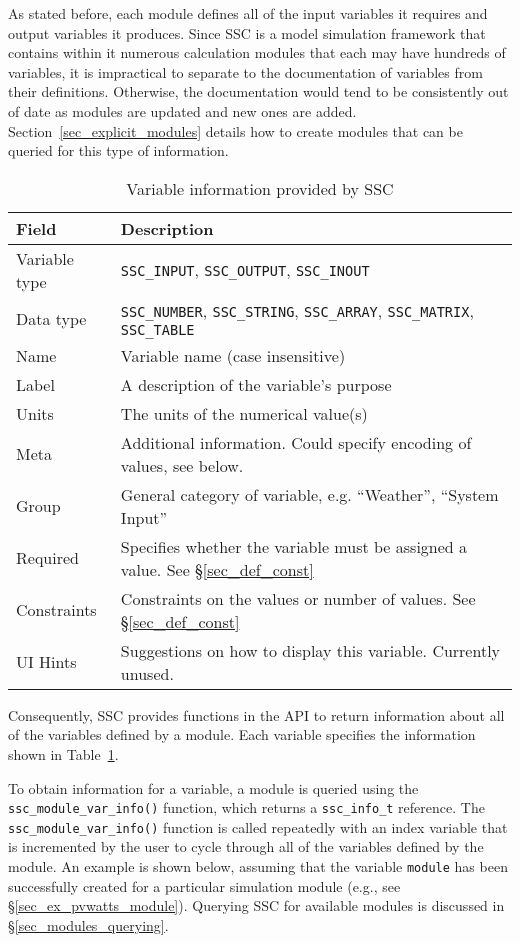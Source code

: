 \documentclass{article}
\begin{document}
As stated before, each module defines all of the input variables it requires and output variables it produces.  Since SSC is a model simulation framework that contains within it numerous calculation modules that each may have hundreds of variables, it is impractical to separate to the documentation of variables from their definitions.  Otherwise, the documentation would tend to be consistently out of date as modules are updated and new ones are added.  Section~\ref{sec_explicit_modules} details how to create modules that can be queried for this type of information.

\begin{table}[ht]
\begin{center}
\begin{tabular}{ll}
Field & Description\\
\hline
Variable type & \texttt{SSC\_INPUT}, \texttt{SSC\_OUTPUT}, \texttt{SSC\_INOUT} \\
Data type & \texttt{SSC\_NUMBER}, \texttt{SSC\_STRING}, \texttt{SSC\_ARRAY}, \texttt{SSC\_MATRIX}, \texttt{SSC\_TABLE} \\
Name & Variable name (case insensitive) \\
Label & A description of the variable's purpose \\
Units & The units of the numerical value(s) \\
Meta & Additional information. Could specify encoding of values, see below. \\
Group & General category of variable, e.g. ``Weather'', ``System Input'' \\
Required & Specifies whether the variable must be assigned a value. See \S\ref{sec_def_const} \\
Constraints & Constraints on the values or number of values. See \S\ref{sec_def_const} \\
UI Hints & Suggestions on how to display this variable.  Currently unused. \\
\end{tabular}
\caption{Variable information provided by SSC}
\label{tab_varinfo}
\end{center}
\end{table}

Consequently, SSC provides functions in the API to return information about all of the variables defined by a module.  Each variable specifies the information shown in Table~\ref{tab_varinfo}.

To obtain information for a variable, a module is queried using the \texttt{ssc\_module\_var\_info()} function, which returns a \texttt{ssc\_info\_t} reference.  The \texttt{ssc\_module\_var\_info()} function is called repeatedly with an index variable that is incremented by the user to cycle through all of the variables defined by the module.  An example is shown below, assuming that the variable \texttt{module} has been successfully created for a particular simulation module (e.g., see \S\ref{sec_ex_pvwatts_module}).  Querying SSC for available modules is discussed in \S\ref{sec_modules_querying}.
\end{document}
